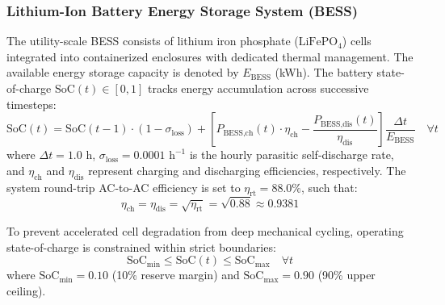 \documentclass[11pt,a4paper]{article}
\begin{document}
\subsubsection{Lithium-Ion Battery Energy Storage System (BESS)}
The utility-scale BESS consists of lithium iron phosphate ($\text{LiFePO}_4$) cells integrated into containerized enclosures with dedicated thermal management. The available energy storage capacity is denoted by $E_{\text{BESS}}$ (kWh). The battery state-of-charge $\text{SoC}(t) \in [0, 1]$ tracks energy accumulation across successive timesteps:
\begin{equation}
    \text{SoC}(t) = \text{SoC}(t-1) \cdot (1 - \sigma_{\text{loss}}) + \left[ P_{\text{BESS,ch}}(t) \cdot \eta_{\text{ch}} - \frac{P_{\text{BESS,dis}}(t)}{\eta_{\text{dis}}} \right] \frac{\Delta t}{E_{\text{BESS}}} \quad \forall t
    \label{eq:bess_soc}
\end{equation}
where $\Delta t = 1.0\text{ h}$, $\sigma_{\text{loss}} = 0.0001\text{ h}^{-1}$ is the hourly parasitic self-discharge rate, and $\eta_{\text{ch}}$ and $\eta_{\text{dis}}$ represent charging and discharging efficiencies, respectively. The system round-trip AC-to-AC efficiency is set to $\eta_{\text{rt}} = 88.0\%$, such that:
\begin{equation}
    \eta_{\text{ch}} = \eta_{\text{dis}} = \sqrt{\eta_{\text{rt}}} = \sqrt{0.88} \approx 0.9381
    \label{eq:efficiency}
\end{equation}

To prevent accelerated cell degradation from deep mechanical cycling, operating state-of-charge is constrained within strict boundaries:
\begin{equation}
    \text{SoC}_{\min} \le \text{SoC}(t) \le \text{SoC}_{\max} \quad \forall t
    \label{eq:soc_limits}
\end{equation}
where $\text{SoC}_{\min} = 0.10$ (10\% reserve margin) and $\text{SoC}_{\max} = 0.90$ (90\% upper ceiling). 
\end{document}
